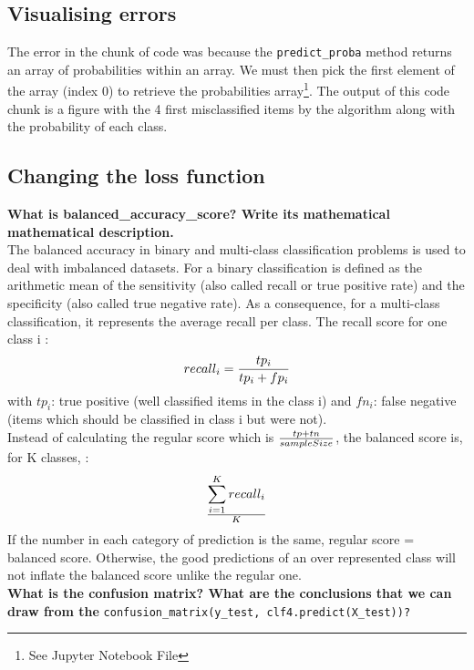 \subsection{Visualising errors}
The error in the chunk of code was because the \verb|predict_proba| method returns an array of probabilities within an array. We must then pick the first element of the array (index 0) to retrieve the probabilities array\footnote{See Jupyter Notebook File}. The output of this code chunk is a figure with the 4 first misclassified items by the algorithm along with the probability of each class.  \\

\subsection{Changing the loss function}

\textbf{What is balanced\_accuracy\_score? Write its mathematical mathematical description.} \\

The balanced accuracy in binary and multi-class classification problems is used to deal with imbalanced datasets. 
For a binary classification is defined as the arithmetic mean of the sensitivity (also called recall or true positive rate) and the specificity (also called true negative rate). As a consequence, for a multi-class classification, it represents the average recall per class. The recall score for one class i :
\begin{equation*} recall_i = {tp_i\over tp_i + fp_i}\end{equation*} 
with $tp_i$: true positive (well classified items in the class i) and $fn_i$: false negative (items which should be classified in class i but were not).\\
Instead of calculating the regular score which is $tp+tn \over sampleSize$, the balanced score is, for K classes, :  
\begin{equation*}
	\sum^K_{i=1}recall_i \over K
\end{equation*}
If the number in each category of prediction is the same, regular score = balanced score. Otherwise, the good predictions of an over represented class will not inflate the balanced score unlike the regular one.\\


\textbf{What is the confusion matrix? What are the conclusions that we can draw from the} \verb|confusion_matrix(y_test, clf4.predict(X_test))?| \\

